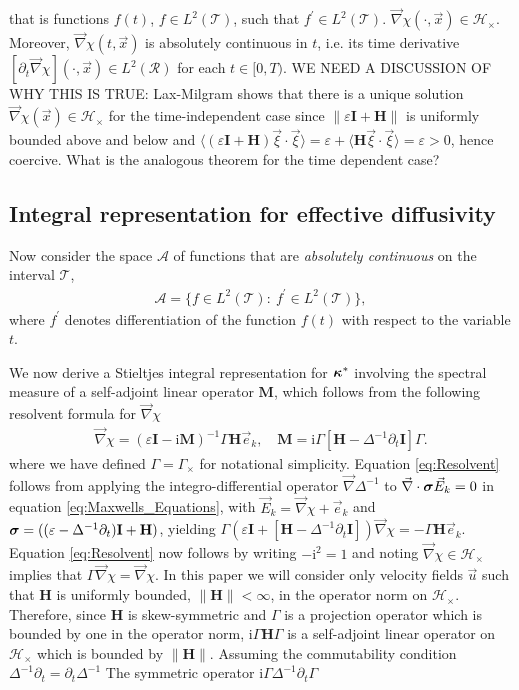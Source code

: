 \documentclass[11pt]{amsart}
\newcommand{\I}{\mathrm{i}}
\newcommand{\Mb}{\mathbf{M}}
\newcommand{\Hb}{\mathbf{H}}
\newcommand{\Ib}{\mathbf{I}}
\newcommand{\Tc}{\mathcal{T}}
\newcommand{\Rc}{\mathcal{R}}
\newcommand{\Hs}{\mathscr{H}}
\newcommand\bsig{\mbox{\boldmath${\sigma}$}}
\newcommand\bkappa{\mbox{\boldmath${\kappa}$}}
\begin{document}
that is
functions 
$f(t)$, $f\in L^2(\Tc)$, such that $f^\prime\in L^2(\Tc)$. 
$\vec{\nabla}\chi(\cdot,\vec{x})\in\Hs_\times$. Moreover,
$\vec{\nabla}\chi(t,\vec{x})$ is absolutely continuous in $t$, i.e. its time
derivative $[\partial_t\vec{\nabla}\chi](\cdot,\vec{x})\in L^2(\Rc)$ for each $t\in[0,T)$.
WE NEED A DISCUSSION OF WHY THIS IS TRUE: Lax-Milgram shows that there
is a unique solution $\vec{\nabla}\chi(\vec{x})\in\Hs_\times$ for the
time-independent case since $\|\varepsilon\Ib+\Hb\|$ is uniformly bounded above
and below and
$\langle(\varepsilon\Ib+\Hb)\vec{\xi}\cdot\vec{\xi}\rangle=\varepsilon+\langle\Hb\vec{\xi}\cdot\vec{\xi}\rangle=\varepsilon>0$, hence
coercive. What is the analogous theorem for the time dependent case?



\subsection{Integral representation for effective
  diffusivity}\label{sec:Integral_Rep}
%


Now consider the space $\mathscr{A}$ of functions that are
\emph{absolutely continuous} on the interval $\Tc$,
%
\begin{align}\label{eq:Abs_Cont}
  \mathscr{A}=\{f\in L^2(\Tc): \ f^\prime\in L^2(\Tc)\},
\end{align}
%
where $f^\prime$ denotes differentiation of the function $f(t)$ with
respect to the variable $t$.



We now derive a Stieltjes integral representation for $\bkappa^*$
involving the spectral measure of a self-adjoint linear operator
$\Mb$, which follows from the following resolvent formula for
$\vec{\nabla}\chi$  
%
\begin{align}\label{eq:Resolvent}
  \vec{\nabla}\chi=(\varepsilon\Ib-\I\Mb)^{-1}\Gamma\Hb\vec{e}_k, \quad
  \Mb=\I\Gamma[\Hb-\Delta^{-1}\partial_t\Ib]\Gamma.
\end{align}
%
where we have defined $\Gamma=\Gamma_\times$ for notational simplicity. Equation
\eqref{eq:Resolvent} follows from applying the integro-differential
operator $\vec{\nabla}\Delta^{-1}$ to $\vec{\nabla}\cdot\bsig\vec{E}_k=0$ in equation 
\eqref{eq:Maxwells_Equations}, with $\vec{E}_k=\vec{\nabla}\chi+\vec{e}_k$ and
$\bsig=((\varepsilon-\Delta^{-1}\partial_t)\Ib+\Hb)$, yielding
$\Gamma(\varepsilon\Ib+[\Hb-\Delta^{-1}\partial_t\Ib])\vec{\nabla}\chi=-\Gamma\Hb\vec{e}_k$. Equation
\eqref{eq:Resolvent} now follows by writing $-\I^2=1$ and noting 
$\vec{\nabla}\chi\in\Hs_\times$ implies that $\Gamma\vec{\nabla}\chi=\vec{\nabla}\chi$. In this paper
we will consider only velocity fields $\vec{u}$ such that $\Hb$ is
uniformly bounded, $\|\Hb\|<\infty$, in the operator norm on
$\Hs_\times$. Therefore, since $\Hb$ is skew-symmetric and $\Gamma$ is a
projection operator which is bounded by one in the operator norm,
$\I\Gamma\Hb\Gamma$ is a self-adjoint linear operator on $\Hs_\times$ which
is bounded by $\|\Hb\|$. Assuming the commutability condition $\Delta^{-1}\partial_t=\partial_t\Delta^{-1}$ The symmetric operator $\I\Gamma\Delta^{-1}\partial_t\Gamma$
\end{document}
